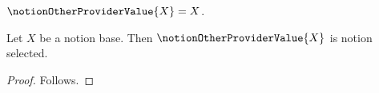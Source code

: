 

\begin{definition}\label{notion_other_provider_value}
    $\notionOtherProviderValue{X}=X$.
\end{definition}

\begin{proposition}\label{notion_other_provider_rule_missing}
    Let $X$ be a notion base.
    Then $\notionOtherProviderValue{X}$ is notion selected.
\end{proposition}
\begin{proof}
    Follows.
\end{proof}
